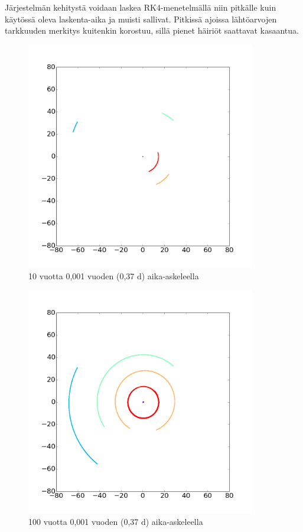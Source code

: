 \documentclass[12pt,a4paper,titlepage]{article}
\begin{document}
Järjestelmän kehitystä voidaan laskea RK4-menetelmällä niin pitkälle kuin käytössä oleva laskenta-aika ja muisti sallivat. Pitkissä ajoissa lähtöarvojen tarkkuuden merkitys kuitenkin korostuu, sillä pienet häiriöt saattavat kasaantua. 

\begin{figure}
\centering
\includegraphics[width=10cm]{../kuvat/10-0001-mkp.png}
\caption{10 vuotta 0,001 vuoden (0,37 d) aika-askeleella}
\label{10-0.001}
\end{figure}

\begin{figure}
\centering
\includegraphics[width=10cm]{../kuvat/100-0001-mkp.png}
\caption{100 vuotta 0,001 vuoden (0,37 d) aika-askeleella}
\label{100-0.001}
\end{figure}
\end{document}
